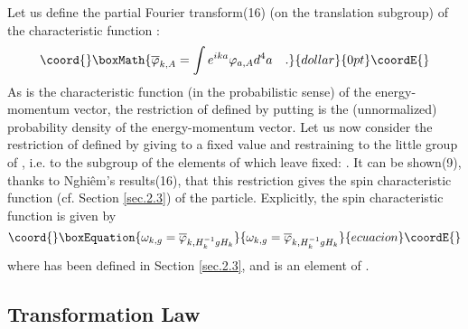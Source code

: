 \documentclass[a4paper,11pt]{article}
\begin{document}
Let us define the partial Fourier transform(16) (on the translation subgroup) of the 
characteristic function \myHighlight{$\phi$}\coordHE{}:
$$\coord{}\boxMath{
  \phib_{k,A} = \int e^{ika} \phi_{a,A} d^4a  \quad .
}{dollar}{0pt}\coordE{}$$
As \coordHE{} is the characteristic function (in the probabilistic sense) of the 
energy-momentum 
vector, the restriction of \myHighlight{$\overline \varphi$}\coordHE{} defined by putting \coordHE{} is the (unnormalized) 
probability density of the energy-momentum vector. 
Let us now consider the restriction of \myHighlight{$\phib$}\coordHE{} defined by giving to \coordHE{} a fixed value and 
restraining \coordHE{} 
to the little group of \coordHE{}, i.e. to the subgroup of the elements of \coordHE{} which leave \coordHE{} 
fixed: 
\coordHE{}. It can be shown(9), thanks to Nghi\^em's results(16), that this restriction gives the 
spin 
characteristic function (cf. Section \ref{sec.2.3}) of the particle. Explicitly, the spin 
characteristic function is given by
\begin{equation}\coord{}\boxEquation{
 \label{eq.5.2}
    \omega_{k,g} = \phib_{k,H_k^{-1}gH_k}
}{
 \omega_{k,g} = \phib_{k,H_k^{-1}gH_k}
}{ecuacion}\coordE{}\end{equation}
where \coordHE{} has been defined in Section \ref{sec.2.3}, and \coordHE{} is an element of \coordHE{}. 

\subsection{Transformation Law}
\end{document}
